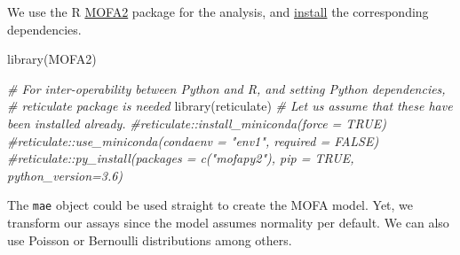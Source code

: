 \documentclass[
]{book}
\newenvironment{Shaded}{\begin{snugshade}}{\end{snugshade}}
\newcommand{\CommentTok}[1]{\textcolor[rgb]{0.56,0.35,0.01}{\textit{#1}}}
\newcommand{\FunctionTok}[1]{\textcolor[rgb]{0.00,0.00,0.00}{#1}}
\newcommand{\NormalTok}[1]{#1}
\begin{document}
We use the R \href{https://biofam.github.io/MOFA2/index.html}{MOFA2}
package for the analysis, and
\href{https://biofam.github.io/MOFA2/installation.html}{install} the
corresponding dependencies.

\begin{Shaded}
\begin{Highlighting}[]
\FunctionTok{library}\NormalTok{(MOFA2)}

\CommentTok{\# For inter{-}operability between Python and R, and setting Python dependencies,}
\CommentTok{\# reticulate package is needed}
\FunctionTok{library}\NormalTok{(reticulate)}
\CommentTok{\# Let us assume that these have been installed already.}
\CommentTok{\#reticulate::install\_miniconda(force = TRUE)}
\CommentTok{\#reticulate::use\_miniconda(condaenv = "env1", required = FALSE)}
\CommentTok{\#reticulate::py\_install(packages = c("mofapy2"), pip = TRUE, python\_version=3.6)}
\end{Highlighting}
\end{Shaded}

The \texttt{mae} object could be used straight to create the MOFA model. Yet,
we transform our assays since the model assumes normality per
default. We can also use Poisson or Bernoulli distributions among others.
\end{document}
